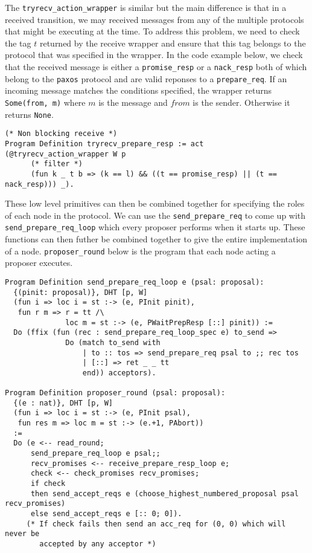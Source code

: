 The \texttt{tryrecv\_action\_wrapper} is similar but the main difference is that in
a received transition, we may received messages from any of the multiple protocols
that might be executing at the time. To address this problem, we need to check the
tag $t$ returned by the receive wrapper and ensure that this tag belongs to the
protocol that was specified in the wrapper. In the code example below, we check
that the received message is either a \texttt{promise\_resp} or a \texttt{nack\_resp}
both of which belong to the \texttt{paxos} protocol and are valid reponses to a
\texttt{prepare\_req}.
If an incoming message matches the conditions specified, the wrapper returns
\texttt{Some(from, m)} where $m$ is the message and $from$ is the sender. Otherwise
it returns \texttt{None}.

\begin{lstlisting}
(* Non blocking receive *)
Program Definition tryrecv_prepare_resp := act (@tryrecv_action_wrapper W p
      (* filter *)
      (fun k _ t b => (k == l) && ((t == promise_resp) || (t == nack_resp))) _).
\end{lstlisting}

These low level primitives can then be combined together for specifying the roles
of each node in the protocol. We can use the \texttt{send\_prepare\_req} to
come up with \texttt{send\_prepare\_req\_loop} which every proposer performs when
it starts up. These functions can then futher be combined together to give the
entire implementation of a node. \texttt{proposer\_round} below is the program
that each node acting a proposer executes.
\begin{lstlisting}
Program Definition send_prepare_req_loop e (psal: proposal):
  {(pinit: proposal)}, DHT [p, W]
  (fun i => loc i = st :-> (e, PInit pinit),
   fun r m => r = tt /\
              loc m = st :-> (e, PWaitPrepResp [::] pinit)) :=
  Do (ffix (fun (rec : send_prepare_req_loop_spec e) to_send =>
              Do (match to_send with
                  | to :: tos => send_prepare_req psal to ;; rec tos
                  | [::] => ret _ _ tt
                  end)) acceptors).

Program Definition proposer_round (psal: proposal):
  {(e : nat)}, DHT [p, W]
  (fun i => loc i = st :-> (e, PInit psal),
   fun res m => loc m = st :-> (e.+1, PAbort))
  :=
  Do (e <-- read_round;
      send_prepare_req_loop e psal;;
      recv_promises <-- receive_prepare_resp_loop e;
      check <-- check_promises recv_promises;
      if check
      then send_accept_reqs e (choose_highest_numbered_proposal psal recv_promises)
      else send_accept_reqs e [:: 0; 0]).
     (* If check fails then send an acc_req for (0, 0) which will never be
        accepted by any acceptor *)
\end{lstlisting}

